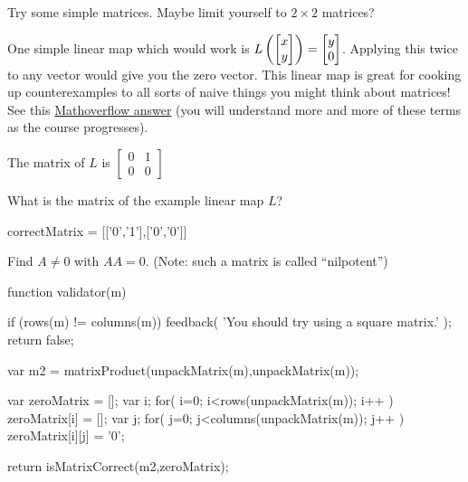 \documentclass{ximera}
\begin{document}
\begin{question}
  \begin{solution}
	\begin{hint}
		Try some simple matrices.  Maybe limit yourself to $2\times2$ matrices?
	\end{hint}
	\begin{hint}
		One simple linear map which would work is
                $L\left(\begin{bmatrix}x\\y\end{bmatrix}\right) =
                \begin{bmatrix}y\\0\end{bmatrix}$.  Applying this twice to any
                vector would give you the zero vector.  This linear
                map is great for cooking up counterexamples to all
                sorts of naive things you might think about matrices!
                See this
                \href{http://mathoverflow.net/questions/16829/what-are-your-favorite-instructional-counterexamples/16841#16841}{Mathoverflow
                  answer} (you will understand more and more of these
                terms as the course progresses).
		
		\begin{question}
			\begin{hint}
				The matrix of $L$ is $\begin{bmatrix} 0&1\\0&0 \end{bmatrix}$
			\end{hint}
			What is the matrix of the example linear map $L$?
			\begin{matrix-answer}[name=A]
				correctMatrix = [['0','1'],['0','0']]
			\end{matrix-answer}
		\end{question}
	\end{hint}
	
    Find $A \neq 0$ with $AA = 0$.  (Note:  such a matrix is called ``nilpotent'')

    \begin{matrix-answer}[name=A]
    function validator(m) {
      if (rows(m) != columns(m)) {
        feedback( 'You should try using a square matrix.' );
        return false;
      }
      
      var m2 = matrixProduct(unpackMatrix(m),unpackMatrix(m));
      
      var zeroMatrix = [];
      var i;
      for( i=0; i<rows(unpackMatrix(m)); i++ ) {
        zeroMatrix[i] = [];
        var j;
        for( j=0; j<columns(unpackMatrix(m)); j++ ) {
          zeroMatrix[i][j] = '0';
        }
      }

      return isMatrixCorrect(m2,zeroMatrix);
    }
    \end{matrix-answer}
  \end{solution}
\end{question}
	
\end{document}
